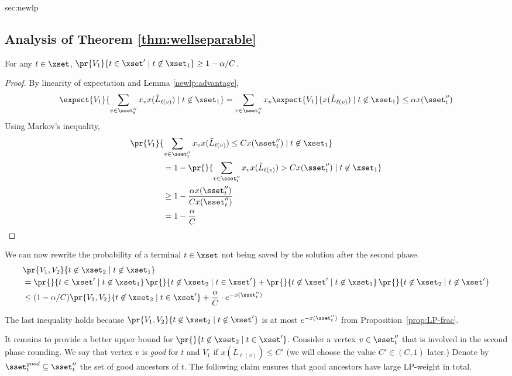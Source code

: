 \begin{appendixextra}{sec:newlp}{\subsection{Analysis of Theorem \ref{thm:wellseparable}}}
\begin{claim}
\label{improv:layer:alt:goodterm}
For any $t \in \xset$,
$\pr{V_1}{t \in \xset' \mid t \not \in \xset_1} \geq 1- \alpha/C$. 
\end{claim}

\begin{proof} 
By linearity of expectation and Lemma \ref{newlp:advantage}, 
\[\expect{V_1}{\sum_{v \in \sset''_t} x_v x(\tilde L_{\ell(v)}) \mid t \not \in \xset_1} = \sum_{v \in \sset''_t} x_v \expect{V_1}{x(\tilde L_{\ell(v)}) \mid t \not \in \xset_1} \leq \alpha x(\sset''_t)\]
Using Markov's inequality, 
\begin{align*}
&\pr{V_1}{\sum_{v \in \sset''_t} x_v x(\tilde L_{\ell(v)}) \leq C x(\sset''_t) \mid t \not \in \xset_1} \\
  &\quad\quad\quad\quad= 1 - \pr{}{\sum_{v \in \sset''_t} x_v x(\tilde L_{\ell(v)})   > C x(\sset''_t) \mid t \not \in \xset_1} \\
  &\quad\quad\quad\quad\geq 1 - \frac{\alpha x(\sset''_t)}{C x(\sset''_t)} \\
  &\quad\quad\quad\quad= 1 - \frac{\alpha }{C}
\end{align*}
\end{proof} 


We can now rewrite the probability of a terminal $t \in \xset$ not being saved by the solution after the second phase.
\begin{align*}
&\pr{V_1, V_2}{t \not \in \xset_2 \mid  t \not \in \xset_1 } \\
&= \pr{}{ t \in \xset' \mid  t \not \in \xset_1}\,\pr{}{t \not \in \xset_2\mid  t \in \xset'} 
        + \pr{}{t \not \in \xset' \mid t \not \in \xset_1}\,\pr{}{ t \not \in \xset_2 \mid t \not \in \xset'}\\
&\leq (1-\alpha/C) \pr{V_1, V_2}{t \not \in \xset_2  \mid t \in \xset'} 
       + \frac{\alpha}{C} \cdot e^{-x(\sset''_t)}
\end{align*}

The last inequality holds because $\pr{V_1, V_2}{t \not \in \xset_2 \mid t \not\in \xset'}$ is at most $e^{-x(\sset''_t)}$ from Proposition~\ref{prop:LP-frac}.
 
It remains to provide a better
upper bound for $\pr{}{t \not \in \xset_2 \mid t \in \xset'}$. 
Consider a vertex $v \in \sset''_t$ that is involved in the second phase rounding.  
We say that vertex $v$  is \emph{good} for $t$ and $V_1$ if $x(\tilde L_{\ell(v)}) \leq C'$ (we will choose the value $C' \in (C,1)$ later.)  
Denote by $\sset^{good}_t \subseteq \sset''_t$ the set of good ancestors of $t$. 
The following claim ensures that good ancestors have large LP-weight in total. 


\end{appendixextra}
